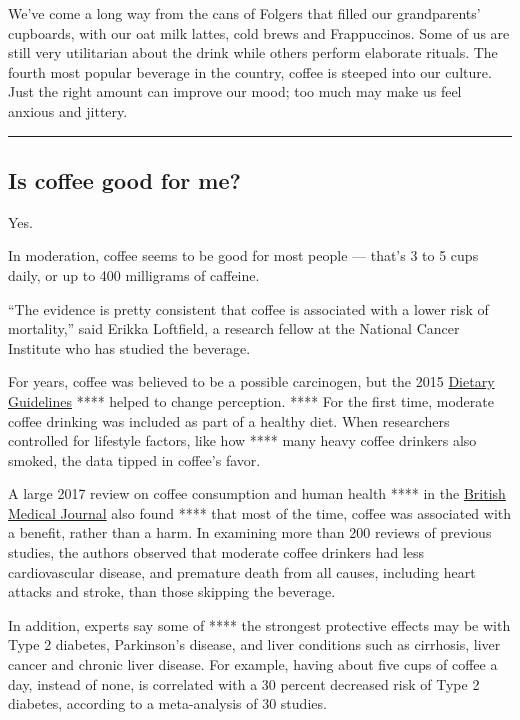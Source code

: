 We've come a long way from the cans of Folgers that filled our
grandparents' cupboards, with our oat milk lattes, cold brews and
Frappuccinos. Some of us are still very utilitarian about the drink
while others perform elaborate rituals. The fourth most popular beverage
in the country, coffee is steeped into our culture. Just the right
amount can improve our mood; too much may make us feel anxious and
jittery.

\begin{center}\rule{0.5\linewidth}{\linethickness}\end{center}

\hypertarget{is-coffee-good-for-me}{%
\subsection{Is coffee good for me?}\label{is-coffee-good-for-me}}

Yes.

In moderation, coffee seems to be good for most people --- that's 3 to 5
cups daily, or up to 400 milligrams of caffeine.

``The evidence is pretty consistent that coffee is associated with a
lower risk of mortality,'' said Erikka Loftfield, a research fellow at
the National Cancer Institute who has studied the beverage.

For years, coffee was believed to be a possible carcinogen, but the 2015
\href{https://health.gov/dietaryguidelines/2015-scientific-report/PDFs/Scientific-Report-of-the-2015-Dietary-Guidelines-Advisory-Committee.pdf}{Dietary
Guidelines} **** helped to change perception. **** For the first time,
moderate coffee drinking was included as part of a healthy diet. When
researchers controlled for lifestyle factors, like how **** many heavy
coffee drinkers also smoked, the data tipped in coffee's favor.

A large 2017 review on coffee consumption and human health **** in the
\href{https://www.bmj.com/content/359/bmj.j5024.long}{British Medical
Journal} also found **** that most of the time, coffee was associated
with a benefit, rather than a harm. In examining more than 200 reviews
of previous studies, the authors observed that moderate coffee drinkers
had less cardiovascular disease, and premature death from all causes,
including heart attacks and stroke, than those skipping the beverage.

In addition, experts say some of **** the strongest protective effects
may be with Type 2 diabetes, Parkinson's disease, and liver conditions
such as cirrhosis, liver cancer and chronic liver disease. For example,
having about five cups of coffee a day, instead of none, is correlated
with a 30 percent decreased risk of Type 2 diabetes, according to a
meta-analysis of 30 studies.

